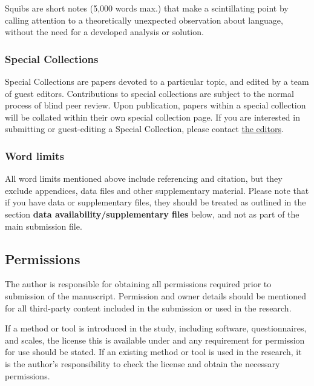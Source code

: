 \documentclass[cm,linguex]{glossa}
\begin{document}
Squibs are short notes (5,000 words max.) that make a scintillating
point by calling attention to a theoretically unexpected observation
about language, without the need for a developed analysis or solution.

\hypertarget{special-collections}{%
\subsubsection{Special Collections}\label{special-collections}}

Special Collections are papers devoted to a particular topic, and edited
by a team of guest editors. Contributions to special collections are
subject to the normal process of blind peer review. Upon publication,
papers within a special collection will be collated within their own
special collection page. If you are interested in submitting or
guest-editing a Special Collection, please contact
\href{https://www.glossa-journal.org/about/editorialteam/}{the editors}.

\hypertarget{word-limits}{%
\subsubsection{Word limits}\label{word-limits}}

All word limits mentioned above include referencing and citation, but
they exclude appendices, data files and other supplementary material.
Please note that if you have data or supplementary files, they should be
treated as outlined in the section \textbf{data
availability/supplementary files} below, and not as part of the main
submission file.

\hypertarget{permissions}{%
\subsection{Permissions}\label{permissions}}

The author is responsible for obtaining all permissions required prior
to submission of the manuscript. Permission and owner details should be
mentioned for all third-party content included in the submission or used
in the research.

If a method or tool is introduced in the study, including software,
questionnaires, and scales, the license this is available under and any
requirement for permission for use should be stated. If an existing
method or tool is used in the research, it is the author's
responsibility to check the license and obtain the necessary
permissions.
\end{document}
